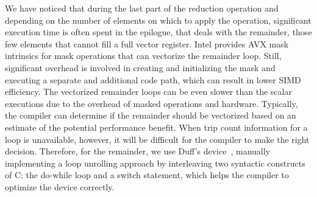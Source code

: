 \documentclass[5p,times,twocolumn]{elsarticle}
\begin{document}
We have noticed that during the last part of the reduction operation and depending on the number of elements on which to apply the
operation, significant execution time is often spent in the
epilogue, that deals with the remainder, those few elements that cannot fill a full vector register.
Intel provides AVX mask intrinsics for mask operations that can vectorize the remainder loop.
Still, significant overhead is involved in creating and initializing the mask and
executing a separate and additional code path, which can result in lower SIMD efficiency.
%
The vectorized remainder loops can be even slower than the scalar executions due to the overhead of masked operations and hardware.
%
Typically, the compiler can determine if the remainder should be vectorized
based on an estimate of the potential performance benefit. When trip count information for a
loop is unavailable, however, it will be difficult for the
compiler to make the right decision.
%
Therefore, for the remainder, we use Duff's
device~\cite{wiki:duff}, manually implementing a loop unrolling approach by
interleaving two syntactic constructs of C: the do-while loop and a
switch statement, which helps the compiler to optimize the device
correctly.

\end{document}
